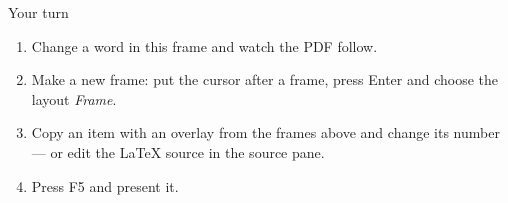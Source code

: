 \documentclass[aspectratio=169]{beamer}
\begin{document}
\begin{frame}{Your turn}
\begin{enumerate}
\item Change a word in this frame and watch the PDF follow.
\item Make a new frame: put the cursor after a frame, press Enter and choose the layout \emph{Frame}.
\item Copy an item with an overlay from the frames above and change its number --- or edit the \LaTeX{} source in the source pane.
\item Press F5 and present it.
\end{enumerate}
\end{frame}
\end{document}
